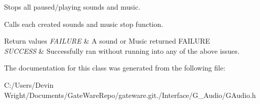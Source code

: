 Stops all paused/playing sounds and music. 

Calls each created sound\textquotesingle{}s and music stop function. 
\begin{DoxyRetVals}{Return values}
{\em F\+A\+I\+L\+U\+RE} & A sound or Music returned F\+A\+I\+L\+U\+RE \\
\hline
{\em S\+U\+C\+C\+E\+SS} & Successfully ran without running into any of the above issues. \\
\hline
\end{DoxyRetVals}


The documentation for this class was generated from the following file\+:\begin{DoxyCompactItemize}
\item 
C\+:/\+Users/\+Devin Wright/\+Documents/\+Gate\+Ware\+Repo/gateware.\+git./\+Interface/\+G\+\_\+\+Audio/G\+Audio.\+h\end{DoxyCompactItemize}
